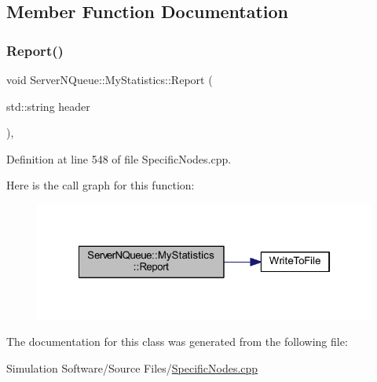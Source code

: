 \subsection{Member Function Documentation}
\mbox{\label{class_server_n_queue_1_1_my_statistics_ae070c508a1934a43cc167dd6a8917d86}} 
\subsubsection{\texorpdfstring{Report()}{Report()}}
{\footnotesize\ttfamily void Server\+N\+Queue\+::\+My\+Statistics\+::\+Report (\begin{DoxyParamCaption}\item[{std\+::string}]{header }\end{DoxyParamCaption})\hspace{0.3cm}{\ttfamily [inline]}, {\ttfamily [override]}}



Definition at line 548 of file Specific\+Nodes.\+cpp.

Here is the call graph for this function\+:\nopagebreak
\begin{figure}[H]
\begin{center}
\leavevmode
\includegraphics[width=322pt]{class_server_n_queue_1_1_my_statistics_ae070c508a1934a43cc167dd6a8917d86_cgraph}
\end{center}
\end{figure}


The documentation for this class was generated from the following file\+:\begin{DoxyCompactItemize}
\item 
Simulation Software/\+Source Files/\hyperlink{_specific_nodes_8cpp}{Specific\+Nodes.\+cpp}\end{DoxyCompactItemize}
